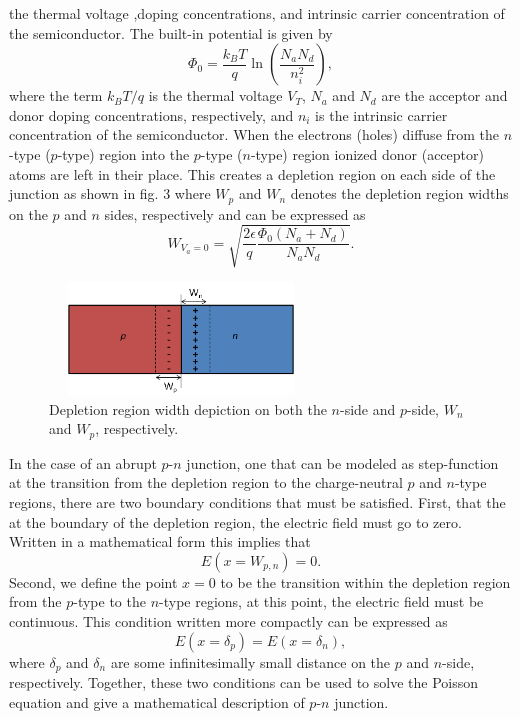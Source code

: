\documentclass[%
 reprint,
 amsmath,amssymb,
 aps,
pra,
floatfix,
]{revtex4-1}
\begin{document}
the thermal voltage ,doping concentrations, and intrinsic carrier concentration of the semiconductor. 
The built-in potential is given by 
%
\begin{equation}
    \label{eq:phi0_eq}
    \Phi_0 = \frac{k_BT}{q}\ln{\left(\frac{N_aN_d}{n_i^2}\right)},
\end{equation}
%
where the term $k_BT/q$ is the thermal voltage $V_T$, $N_a$ and $N_d$ are the acceptor and donor doping concentrations, respectively, and
$n_i$ is the intrinsic carrier concentration of the semiconductor. When the electrons (holes) diffuse from the $n$-type ($p$-type) 
region into the $p$-type ($n$-type) region ionized donor (acceptor) atoms are left in their place. This creates a depletion region on each side of the 
junction as shown in fig. 3 where $W_p$ and $W_n$ denotes the depletion region widths on the $p$ and $n$
sides, respectively and can be expressed as
%
\begin{equation}\label{eq:depletion_width}
    W_{V_a=0} = \sqrt{\frac{2\epsilon}{q}\frac{\Phi_0\left(N_a+N_d\right)}{N_aN_d}}.
\end{equation}
%
\begin{figure}[h!]
    \centering
    \includegraphics[height=3cm,width=7cm]{figs/unbias_pn_junction_depletion_region}
    \caption{Depletion region width depiction on both the $n$-side and $p$-side, $W_n$ and $W_p$, respectively.}
    \label{fig:fig3}
\end{figure}
%
In the case of an abrupt $p$-$n$ junction, one that can be modeled as step-function at the transition
from the depletion region to the charge-neutral $p$ and $n$-type regions, there are two boundary conditions that must be 
satisfied. First, that the at the boundary of the depletion region, the electric field must go to zero. Written in 
a mathematical form this implies that 
%
\begin{equation}
    \label{eq:bc1}
    E(x=W_{p,n}) = 0.
\end{equation}
%
Second, we define the point $x = 0$ to be the transition within the depletion region from the $p$-type to the $n$-type regions, at this point, the 
electric field must be continuous. This condition written more compactly can be expressed as
%
\begin{equation}
    \label{eq:bc2}
    E(x = \delta_{p}) = E(x = \delta_{n}),
\end{equation}
%
where $\delta_p$ and $\delta_n$ are some infinitesimally small distance on the $p$ and $n$-side, respectively. Together,
these two conditions can be used to solve the Poisson equation and give a mathematical description of $p$-$n$ junction.
\end{document}
